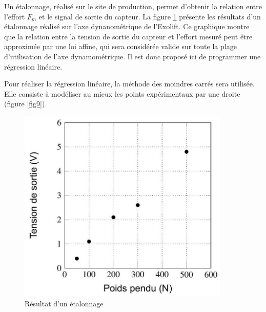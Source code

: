 Un étalonnage, réalisé sur le site de production, permet d'obtenir la relation entre l'effort $F_{m}$ et le signal de sortie du capteur. La figure \ref{fig8} présente les résultats d'un étalonnage réalisé sur l'axe dynanométrique de l'Exolift. Ce graphique montre que la relation entre la tension de sortie du capteur et l'effort mesuré peut être approximée par une loi affine, qui sera considérée valide sur toute la plage d'utilisation de l'axe dynamométrique. Il est donc proposé ici de programmer une régression linéaire.

Pour réaliser la régression linéaire, la méthode des moindres carrés sera utilisée. Elle consiste à modéliser au mieux les points expérimentaux par une droite (figure \ref{fig9}).

\begin{figure}[!htb]
\begin{minipage}{0.5\textwidth}
\begin{center}
\includegraphics[width=0.9\textwidth]{images/2023_10_30_d11e80da56f59e3b3cdfg-07(1)}
\caption{Résultat d'un étalonnage \label{fig8}}
\end{center}
\end{minipage}
\begin{minipage}{0.5\textwidth}
\begin{center}

\end{center}
\end{minipage}
\end{figure}
